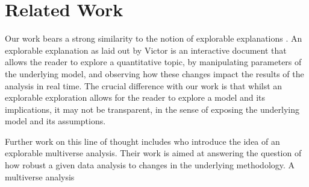 \section{Related Work}
\label{sec:related}

Our work bears a strong similarity to the notion of explorable explanations \cite{victor11b}.
An explorable explanation as laid out by Victor is an interactive document that allows the reader to
explore a quantitative topic, by manipulating parameters of the underlying model, and observing how these
changes impact the results of the analysis in real time. The crucial difference with our work is that 
whilst an explorable exploration allows for the reader to explore a model and its implications, it may
not be transparent, in the sense of exposing the underlying model and its assumptions.

Further work on this line of thought includes \cite{dragicevic19} who introduce the idea of an
explorable multiverse analysis. Their work is aimed at answering the question of how robust a given
data analysis to changes in the underlying methodology. A multiverse analysis 